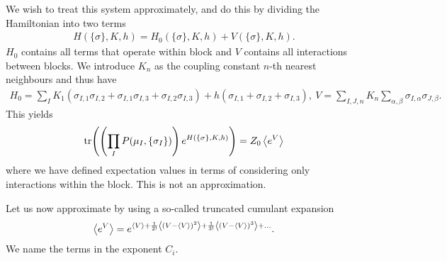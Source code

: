 We wish to treat this system approximately, and do this by dividing the Hamiltonian into two terms
\begin{align*}
	H(\{\sigma\}, K, h) = H_{0}(\{\sigma\}, K, h) + V(\{\sigma\}, K, h).
\end{align*}
$H_{0}$ contains all terms that operate within block and $V$ contains all interactions between blocks. We introduce $K_{n}$ as the coupling constant $n$-th nearest neighbours and thus have
\begin{align*}
	H_{0} = \sum\limits_{I}K_{1}(\sigma_{I, 1}\sigma_{I, 2} + \sigma_{I, 1}\sigma_{I, 3} + \sigma_{I, 2}\sigma_{I, 3}) + h(\sigma_{I, 1} + \sigma_{I, 2} + \sigma_{I, 3}),\ V = \sum\limits_{I, J, n}K_{n}\sum\limits_{\alpha, \beta}\sigma_{I, \alpha}\sigma_{J, \beta}.
\end{align*}
This yields
\begin{align*}
	\tr(\left(\prod\limits_{I}P(\mu_{I}, \{\sigma_{I}\})\right)e^{H(\{\sigma\}, K , h)}) = Z_{0}\expval{e^{V}}
\end{align*}
where we have defined expectation values in terms of considering only interactions within the block. This is not an approximation.

Let us now approximate by using a so-called truncated cumulant expansion
\begin{align*}
	\expval{e^{V}} = e^{\expval{V} + \frac{1}{2!}\expval{(V - \expval{V})^{2}} + \frac{1}{3!}\expval{(V - \expval{V})^{3}} + \dots}.
\end{align*}
We name the terms in the exponent $C_{i}$.

